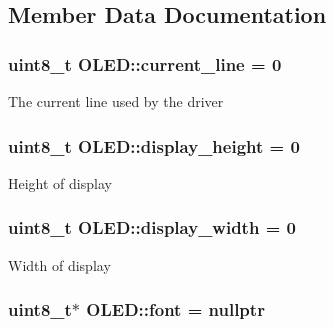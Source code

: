 \subsection{Member Data Documentation}
\hypertarget{class_o_l_e_d_aebd62601be5e2ceef6295721f17fc013}{
\subsubsection[{current\-\_\-line}]{\setlength{\rightskip}{0pt plus 5cm}uint8\-\_\-t O\-L\-E\-D\-::current\-\_\-line = 0\hspace{0.3cm}{\ttfamily [private]}}}\label{class_o_l_e_d_aebd62601be5e2ceef6295721f17fc013}
The current line used by the driver \hypertarget{class_o_l_e_d_add08b51dec0ffeebcba7902c3bd4aeea}{
\subsubsection[{display\-\_\-height}]{\setlength{\rightskip}{0pt plus 5cm}uint8\-\_\-t O\-L\-E\-D\-::display\-\_\-height = 0\hspace{0.3cm}{\ttfamily [private]}}}\label{class_o_l_e_d_add08b51dec0ffeebcba7902c3bd4aeea}
Height of display \hypertarget{class_o_l_e_d_a2e9305cb3341509bb62d61f33cae76fd}{
\subsubsection[{display\-\_\-width}]{\setlength{\rightskip}{0pt plus 5cm}uint8\-\_\-t O\-L\-E\-D\-::display\-\_\-width = 0\hspace{0.3cm}{\ttfamily [private]}}}\label{class_o_l_e_d_a2e9305cb3341509bb62d61f33cae76fd}
Width of display \hypertarget{class_o_l_e_d_a29ab86a4a73f4d343bf1810927f0911d}{
\subsubsection[{font}]{\setlength{\rightskip}{0pt plus 5cm}uint8\-\_\-t$\ast$ O\-L\-E\-D\-::font = nullptr\hspace{0.3cm}{\ttfamily [private]}}}\label{class_o_l_e_d_a29ab86a4a73f4d343bf1810927f0911d}
